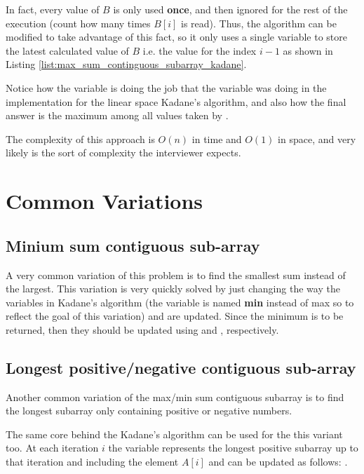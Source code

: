 In fact, every value of $B$ is only used \textbf{once}, and then ignored for the rest of the execution (count how many times $B[i]$ is read).
Thus, the algorithm can be modified to take advantage of this fact, so it only uses a single variable to store the latest calculated
value of $B$ i.e. the value for the index $i-1$ as shown in Listing
\ref{list:max_sum_continguous_subarray_kadane}.




Notice how the variable  is doing the job that the variable 
was doing in the implementation for the linear space Kadane's algorithm, and also how
the final answer is the maximum among all values taken by .

The complexity of this approach is $O(n)$ in time and $O(1)$ in space, and very likely is the sort
of complexity the interviewer expects.

\section{Common Variations}
\subsection{Minium sum contiguous sub-array}
A very common variation of this problem is to find the smallest sum instead of the largest. This variation is very quickly solved by just changing the  way the variables in Kadane's algorithm  (the variable is named \textbf{min} instead of max so to reflect the goal of this variation) and  are updated.
Since the minimum is to be returned, then they should be updated using 
and , respectively.

\subsection{Longest positive/negative contiguous sub-array}
Another common variation of the max/min sum contiguous subarray is to find the longest subarray only containing positive or negative numbers.

The same core behind the Kadane's algorithm can be used for the this variant too. At each iteration $i$ the variable  represents the longest
positive subarray up to that iteration and including the element $A[i]$ and can be updated as follows: .